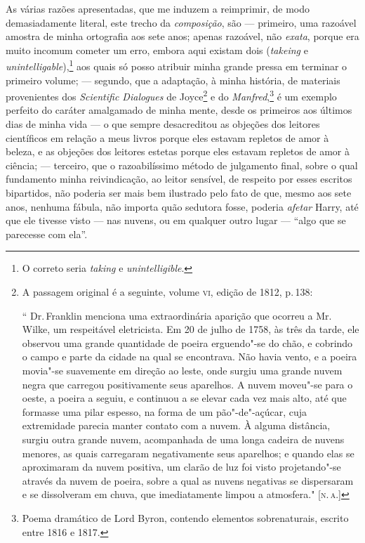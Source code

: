 As várias razões apresentadas, que me induzem a reimprimir, de modo
demasiadamente literal, este trecho da \textit{composição}, são --- primeiro,
uma razoável amostra de minha ortografia aos sete anos; apenas razoável,
não \textit{exata}, porque era muito incomum cometer um erro, embora aqui
existam dois (\textit{takeing} e
\textit{unintelligable}),\footnote{O correto seria \textit{taking} e
  \textit{unintelligible}.} aos quais só posso atribuir
minha grande pressa em terminar o primeiro volume; --- segundo, que a
adaptação, à minha história, de materiais provenientes dos
\textit{Scientific Dialogues} de Joyce\footnote{A passagem original é a seguinte, volume \textsc{vi}, edição de 1812, p.\,138: 

`` Dr.\,Franklin menciona uma extraordinária aparição que ocorreu a Mr.\,Wilke, um respeitável eletricista. Em 20 de julho de 1758, às três da
tarde, ele observou uma grande quantidade de poeira erguendo"-se do
chão, e cobrindo o campo e parte da cidade na qual se encontrava. Não
havia vento, e a poeira movia"-se suavemente em direção ao leste, onde
surgiu uma grande nuvem negra que carregou positivamente seus
aparelhos. A nuvem moveu"-se para o oeste, a poeira a seguiu, e
continuou a se elevar cada vez mais alto, até que formasse uma pilar
espesso, na forma de um pão"-de"-açúcar, cuja extremidade parecia manter
contato com a nuvem. À alguma distância, surgiu outra grande nuvem,
acompanhada de uma longa cadeira de nuvens menores, as quais
carregaram negativamente seus aparelhos; e quando elas se aproximaram
da nuvem positiva, um clarão de luz foi visto projetando"-se através da
nuvem de poeira, sobre a qual as nuvens negativas se dispersaram e se
dissolveram em chuva, que imediatamente limpou a atmosfera." {[}\textsc{n.\,a.}{]}} e do \textit{Manfred},\footnote{Poema dramático de Lord Byron,
contendo elementos sobrenaturais, escrito entre 1816 e 1817.} é um exemplo perfeito do caráter amalgamado de minha mente,
desde os primeiros aos últimos dias de minha vida --- o que sempre
desacreditou as objeções dos leitores científicos em relação a meus
livros porque eles estavam repletos de amor à beleza, e as objeções dos
leitores estetas porque eles estavam repletos de amor à ciência; ---
terceiro, que o razoabilíssimo método de julgamento final, sobre o qual
fundamento minha reivindicação, ao leitor sensível, de respeito por
esses escritos bipartidos, não poderia ser mais bem ilustrado pelo fato
de que, mesmo aos sete anos, nenhuma fábula, não importa quão sedutora
fosse, poderia \textit{afetar} Harry, até que ele tivesse visto --- nas
nuvens, ou em qualquer outro lugar --- ``algo que se parecesse com ela''.

